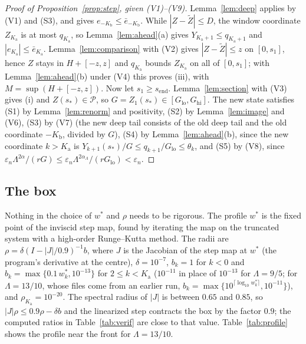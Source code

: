 \documentclass[12pt,reqno]{amsart}
\numberwithin{equation}{section}
\theoremstyle{plain}
\theoremstyle{definition}
\theoremstyle{remark}
\newcommand{\Kb}{K_{\mathrm b}}
\newcommand{\Ka}{K_{\mathrm a}}
\newcommand{\Glo}{G_{\mathrm{lo}}}
\newcommand{\Ghi}{G_{\mathrm{hi}}}
\newcommand{\send}{s_{\mathrm{end}}}
\newcommand{\eps}{\varepsilon}
\begin{document}
\begin{proof}[Proof of Proposition~\ref{prop:step}, given \textup{(V1)--(V9)}]
Lemma~\ref{lem:deep} applies by (V1) and (S3), and gives $e_{-\Kb}\le\bar
e_{-\Kb}$. While $|Z-\tilde Z|\le D$, the window coordinate $Z_{\Ka}$ is at most
$q_{\Ka}$, so Lemma~\ref{lem:ahead}(a) gives $Y_{\Ka+1}\le q_{\Ka+1}$ and
$|e_{\Ka}|\le\bar e_{\Ka}$. Lemma~\ref{lem:comparison} with (V2) gives $|Z-\tilde Z|\le z$
on $[0,s_1]$, hence $Z$ stays in $H+[-z,z]$ and $q_{\Ka}$ bounds $Z_{\Ka}$ on all of
$[0,s_1]$; with Lemma~\ref{lem:ahead}(b) under (V4) this proves (iii), with
$M=\sup(H+[-z,z])$. Now let $s_1\ge\send$. Lemma~\ref{lem:section} with (V3)
gives (i) and $Z(s_*)\in\mathcal P$, so $G=Z_1(s_*)\in[\Glo,\Ghi]$. The new state
satisfies (S1) by Lemma~\ref{lem:renorm} and positivity, (S2) by
Lemma~\ref{lem:image} and (V6), (S3) by (V7) (the new deep tail consists
of the old deep tail and the old coordinate $-\Kb$, divided by $G$), (S4)
by Lemma~\ref{lem:ahead}(b), since the new coordinate $k>\Ka$ is
$Y_{k+1}(s_*)/G\le q_{k+1}/\Glo\le\theta_k$, and (S5) by (V8), since
$\eps_n\Lambda^{2\alpha}/(rG)\le\eps_n\Lambda^{2\alpha_\Lambda}/(r\Glo)<\eps_n$.
\end{proof}

\subsection{The box}
Nothing in the choice of $w^*$ and $\rho$ needs to be rigorous. The profile
$w^*$ is the fixed point of the inviscid step map, found by iterating
the map on the truncated system with a high-order Runge--Kutta method.
The radii are
$\rho=\delta(I-|J|/0.9)^{-1}b$, where $J$ is the Jacobian of the step map at
$w^*$ (the program's derivative at the centre), $\delta=10^{-7}$, $b_k=1$ for
$k<0$ and $b_k=\max\{0.1\,w^*_k,10^{-13}\}$ for $2\le k<\Ka$ ($10^{-11}$ in place
of $10^{-13}$ for $\Lambda=9/5$; for $\Lambda=13/10$, whose files come from an
earlier run, $b_k=\max\{10^{\lceil\log_{10}w^*_k\rceil},10^{-11}\}$), and
$\rho_{\Ka}=10^{-20}$. The spectral radius of $|J|$ is
between $0.65$ and $0.85$, so $|J|\rho\le0.9\rho-\delta b$ and the linearized step
contracts the box by the factor $0.9$; the computed ratios in
Table~\ref{tab:verif} are close to that value. Table~\ref{tab:profile}
shows the profile near the front for $\Lambda=13/10$.
\end{document}
